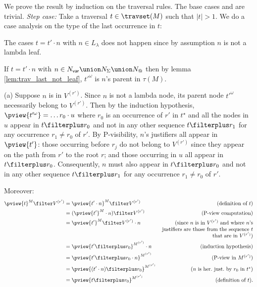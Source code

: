We prove the result by induction on the traversal rules. The base cases  and
 are trivial. \emph{Step case:} Take a traversal $t
\in \travset(M)$ such that $|t|>1$. We do a case analysis on the type of the last occurrence in $t$:
    \begin{compactitem}
    \item The cases $t = t' \cdot n$ with $n\in L_\lambda$ does not happen since by assumption $n$ is not a
    lambda leaf.

    \item If $t = t' \cdot n$ with $n \in N_{\sf var} \union
    N_\Sigma \union N_@$ then by lemma
    \ref{lem:trav_last_not_leaf}, $t'^\omega$ is $n$'s
    parent in $\tau(M)$.

    (a) Suppose $n$ is in $V^{(r')}$. Since $n$ is not a lambda
    node, its parent node $t'^\omega$ necessarily belong to
    $V^{(r')}$. Then by the induction hypothesis,
    $\pview{t'^\omega} = \ldots r_0 \cdot u$ where $r_0$ is
    an occurrence of $r'$ in $t^\star$ and all the nodes in
    $u$ appear in $t\filterplus r_0$ and not in any
    other sequence $t\filterplus r_1$ for any occurrence $r_1\neq r_0$ of $r'$. By P-visibility, $n$'s
    justifiers all appear in $\pview{t'}$:
    those occurring before $r_j$ do not belong
    to $V^{(r')}$ since they appear on the path from $r'$ to
    the root $r$; and those occurring in $u$ all appear in $t\filterplus r_0$.
    Consequently, $n$ must also appear in $t\filterplus r_0$ and not in any
    other sequence $t\filterplus r_1$ for any occurrence $r_1\neq r_0$ of $r'$.

    Moreover:
        \begin{align*}
        \pview{t}^M \filter V^{(r')}
    &= \pview{t' \cdot n}^M \filter  V^{(r')} & (\mbox{definition of } t)\\
            &= (\pview{t'}^M \cdot n) \filter  V^{(r')}  & (\mbox{P-view computation}) \\
            &= \pview{t'}^M \filter V^{(r')}  \cdot n             & \parbox[t]{6cm}{(\raggedleft since $n$ is in $V^{(r')}$ and where $n$'s justifiers are those from the sequence $t$ that are in $V^{(r')}$)} \\
            &= \pview{t' \filterplus  r_0 }^{M^{(r')}} \cdot n            & (\mbox{induction hypothesis}) \\
            &= \pview{t' \filterplus  r_0 \cdot n }^{M^{(r')}} & (\mbox{P-view in $M^{(r')}$}) \\
            &= \pview{(t' \cdot n ) \filterplus  r_0  }^{M^{(r')}}           & (\mbox{$n$ is her.\ just.\ by $r_0$ in $t^\star$}) \\
            &= \pview{t \filterplus  r_0  }^{M^{(r')}}
     & (\mbox{definition of } t).
        \end{align*}


\end{compactitem}
